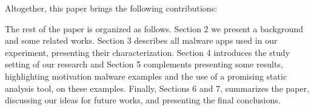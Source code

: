 Altogether, this paper brings the following contributions:


The rest of the paper is organized as follows. Section 2 we present a background and some related works. Section 3 describes all malware apps used in our experiment, presenting their characterization. Section 4 introduces the study setting of our research and Section 5 complements presenting some results, highlighting motivation malware examples and the use of a promising static analysis tool, on these examples. Finally, Sections 6 and 7, summarizes the paper, discussing our ideas for future works, and presenting the final conclusions.



 
 
 
 
